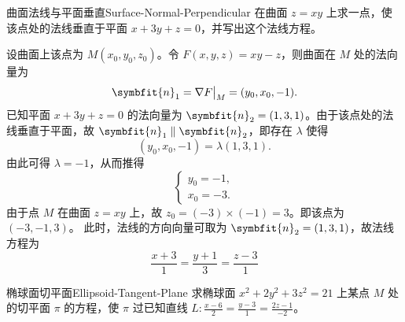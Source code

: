 \begin{problem}{曲面法线与平面垂直}{Surface-Normal-Perpendicular}
    在曲面 $z = xy$ 上求一点，使该点处的法线垂直于平面 $x + 3y + z = 0$，并写出这个法线方程。
\end{problem}

\begin{solution}
    设曲面上该点为 $M(x_0, y_0, z_0)$。令 $F(x, y, z) = xy - z$，则曲面在 $M$ 处的法向量为
    \begin{equation}
        \symbfit{n}_1 = \nabla F \big|_M = (y_0, x_0, -1).
    \end{equation}
    已知平面 $x + 3y + z = 0$ 的法向量为 $\symbfit{n}_2 = (1, 3, 1)$。由于该点处的法线垂直于平面，故 $\symbfit{n}_1 \parallel \symbfit{n}_2$，即存在 $\lambda$ 使得
    \begin{equation}
        (y_0, x_0, -1) = \lambda (1, 3, 1).
    \end{equation}
    由此可得 $\lambda = -1$，从而推得
    \begin{equation}
        \begin{cases}
            y_0 = -1, \\
            x_0 = -3.
        \end{cases}
    \end{equation}
    由于点 $M$ 在曲面 $z = xy$ 上，故 $z_0 = (-3) \times (-1) = 3$。即该点为 $(-3, -1, 3)$。
    此时，法线的方向向量可取为 $\symbfit{n}_2 = (1, 3, 1)$，故法线方程为
    \begin{equation}
        \boxed{\frac{x + 3}{1} = \frac{y + 1}{3} = \frac{z - 3}{1}}
    \end{equation}
\end{solution}


\begin{problem}{椭球面切平面}{Ellipsoid-Tangent-Plane}
    求椭球面 $x^2 + 2y^2 + 3z^2 = 21$ 上某点 $M$ 处的切平面 $\pi$ 的方程，使 $\pi$ 过已知直线 $L: \frac{x - 6}{2} = \frac{y - 3}{1} = \frac{2z - 1}{-2}$。
\end{problem}

